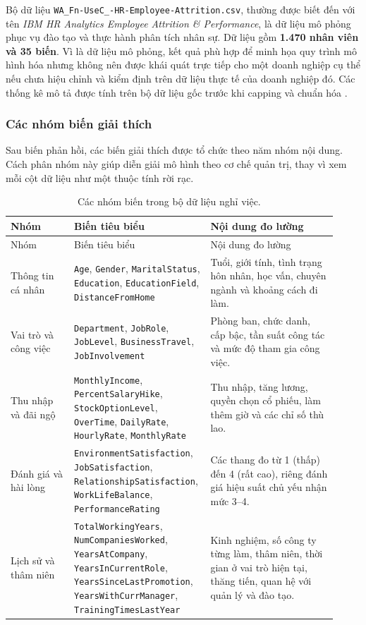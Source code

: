 Bộ dữ liệu \texttt{WA\_Fn-UseC\_-HR-Employee-Attrition.csv}, thường
được biết đến với tên \emph{IBM HR Analytics Employee Attrition \&
Performance}, là dữ liệu mô phỏng phục vụ đào tạo và thực hành phân tích nhân sự. Dữ liệu gồm \textbf{1.470 nhân viên và 35 biến}. Vì là dữ liệu mô phỏng, kết quả phù hợp để minh họa quy trình mô hình hóa nhưng không nên được khái quát trực tiếp cho một doanh nghiệp cụ thể nếu chưa hiệu chỉnh và kiểm định trên dữ liệu thực tế của doanh nghiệp đó.
Các thống kê mô tả được tính trên bộ dữ liệu gốc trước khi capping và
chuẩn hóa \cite{ibm_attrition_data}.

\subsubsection{Các nhóm biến giải thích}

Sau biến phản hồi, các biến giải thích được tổ chức theo năm nhóm nội
dung. Cách phân nhóm này giúp diễn giải mô hình theo cơ chế quản trị,
thay vì xem mỗi cột dữ liệu như một thuộc tính rời rạc.

\begin{longtable}{p{0.19\linewidth}p{0.35\linewidth}p{0.38\linewidth}}
\caption{Các nhóm biến trong bộ dữ liệu nghỉ việc.}\label{tab:hr-variable-groups}\\
\toprule
Nhóm & Biến tiêu biểu & Nội dung đo lường\\
\midrule
\endfirsthead
\toprule
Nhóm & Biến tiêu biểu & Nội dung đo lường\\
\midrule
\endhead
Thông tin cá nhân & \texttt{Age}, \texttt{Gender},
\texttt{MaritalStatus}, \texttt{Education},
\texttt{EducationField}, \texttt{DistanceFromHome} & Tuổi, giới tính,
tình trạng hôn nhân, học vấn, chuyên ngành và khoảng cách đi làm.\\
Vai trò và công việc & \texttt{Department}, \texttt{JobRole},
\texttt{JobLevel}, \texttt{BusinessTravel}, \texttt{JobInvolvement} &
Phòng ban, chức danh, cấp bậc, tần suất công tác và mức độ tham gia công
việc.\\
Thu nhập và đãi ngộ & \texttt{MonthlyIncome},
\texttt{PercentSalaryHike}, \texttt{StockOptionLevel},
\texttt{OverTime}, \texttt{DailyRate}, \texttt{HourlyRate},
\texttt{MonthlyRate} & Thu nhập, tăng lương, quyền chọn cổ phiếu, làm
thêm giờ và các chỉ số thù lao.\\
Đánh giá và hài lòng & \texttt{EnvironmentSatisfaction},
\texttt{JobSatisfaction}, \texttt{RelationshipSatisfaction},
\texttt{WorkLifeBalance}, \texttt{PerformanceRating} & Các thang đo từ
1 (thấp) đến 4 (rất cao), riêng đánh giá hiệu suất chủ yếu nhận mức 3--4.\\
Lịch sử và thâm niên & \texttt{TotalWorkingYears},
\texttt{NumCompaniesWorked}, \texttt{YearsAtCompany},
\texttt{YearsInCurrentRole}, \texttt{YearsSinceLastPromotion},
\texttt{YearsWithCurrManager}, \texttt{TrainingTimesLastYear} & Kinh
nghiệm, số công ty từng làm, thâm niên, thời gian ở vai trò hiện tại,
thăng tiến, quan hệ với quản lý và đào tạo.\\
\bottomrule
\end{longtable}

